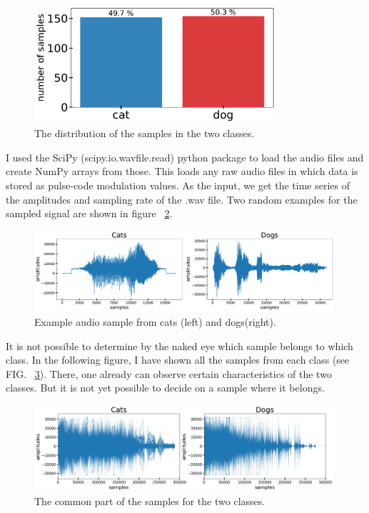 \documentclass[12pt a4paper]{article}
\numberwithin{equation}{section}
\begin{document}
\begin{figure}[H]
\centering
\includegraphics[width=0.8\textwidth]{fig/ration.pdf}
\caption{The distribution of the samples in the two classes.}
\label{fig1}
\end{figure}

I used the SciPy (scipy.io.wavfile.read) python package to load the audio files and create NumPy arrays from those. This loads any raw audio files in which data is stored as pulse-code modulation values. As the input, we get the time series of the amplitudes and sampling rate of the .wav file. Two random examples for the sampled signal are shown in figure ~\ref{fig2}.

\begin{figure}[H]
\centering
\includegraphics[width=0.99\textwidth]{fig/example.pdf}
\caption{Example audio sample from cats (left) and dogs(right).}
\label{fig2}
\end{figure}
It is not possible to determine by the naked eye which sample belongs to which class. In the following figure, I have shown all the samples from each class (see FIG. ~\ref{fig3}). There, one already can observe certain characteristics of the two classes. But it is not yet possible to decide on a sample where it belongs.

\begin{figure}[H]
\centering
\includegraphics[width=0.99\textwidth]{fig/all.jpg}
\caption{The common part of the samples for the two classes.}
\label{fig3}
\end{figure}
\end{document}
